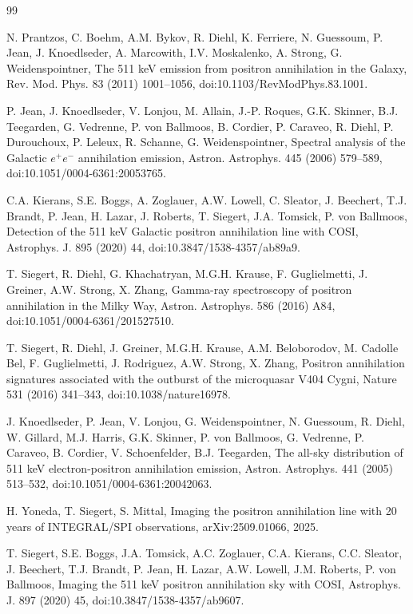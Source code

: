 \documentclass[11pt]{article}
\begin{document}
\begin{thebibliography}{99}

N. Prantzos, C. Boehm, A.M. Bykov, R. Diehl, K. Ferriere, N. Guessoum, P. Jean, J. Knoedlseder, A. Marcowith, I.V. Moskalenko, A. Strong, G. Weidenspointner, The 511 keV emission from positron annihilation in the Galaxy, Rev. Mod. Phys. 83 (2011) 1001--1056, doi:10.1103/RevModPhys.83.1001.

P. Jean, J. Knoedlseder, V. Lonjou, M. Allain, J.-P. Roques, G.K. Skinner, B.J. Teegarden, G. Vedrenne, P. von Ballmoos, B. Cordier, P. Caraveo, R. Diehl, P. Durouchoux, P. Leleux, R. Schanne, G. Weidenspointner, Spectral analysis of the Galactic $e^+e^-$ annihilation emission, Astron. Astrophys. 445 (2006) 579--589, doi:10.1051/0004-6361:20053765.

C.A. Kierans, S.E. Boggs, A. Zoglauer, A.W. Lowell, C. Sleator, J. Beechert, T.J. Brandt, P. Jean, H. Lazar, J. Roberts, T. Siegert, J.A. Tomsick, P. von Ballmoos, Detection of the 511 keV Galactic positron annihilation line with COSI, Astrophys. J. 895 (2020) 44, doi:10.3847/1538-4357/ab89a9.

T. Siegert, R. Diehl, G. Khachatryan, M.G.H. Krause, F. Guglielmetti, J. Greiner, A.W. Strong, X. Zhang, Gamma-ray spectroscopy of positron annihilation in the Milky Way, Astron. Astrophys. 586 (2016) A84, doi:10.1051/0004-6361/201527510.

T. Siegert, R. Diehl, J. Greiner, M.G.H. Krause, A.M. Beloborodov, M. Cadolle Bel, F. Guglielmetti, J. Rodriguez, A.W. Strong, X. Zhang, Positron annihilation signatures associated with the outburst of the microquasar V404 Cygni, Nature 531 (2016) 341--343, doi:10.1038/nature16978.

J. Knoedlseder, P. Jean, V. Lonjou, G. Weidenspointner, N. Guessoum, R. Diehl, W. Gillard, M.J. Harris, G.K. Skinner, P. von Ballmoos, G. Vedrenne, P. Caraveo, B. Cordier, V. Schoenfelder, B.J. Teegarden, The all-sky distribution of 511 keV electron-positron annihilation emission, Astron. Astrophys. 441 (2005) 513--532, doi:10.1051/0004-6361:20042063.

H. Yoneda, T. Siegert, S. Mittal, Imaging the positron annihilation line with 20 years of INTEGRAL/SPI observations, arXiv:2509.01066, 2025.

T. Siegert, S.E. Boggs, J.A. Tomsick, A.C. Zoglauer, C.A. Kierans, C.C. Sleator, J. Beechert, T.J. Brandt, P. Jean, H. Lazar, A.W. Lowell, J.M. Roberts, P. von Ballmoos, Imaging the 511 keV positron annihilation sky with COSI, Astrophys. J. 897 (2020) 45, doi:10.3847/1538-4357/ab9607.


\end{thebibliography}
\end{document}
